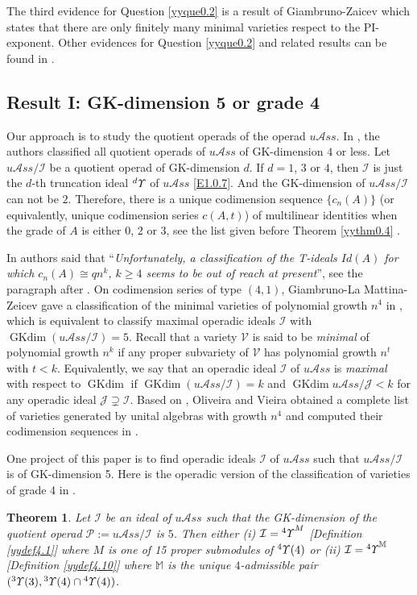 \documentclass{amsart}
\newtheorem{thm}{Theorem}[section]
\theoremstyle{definition}
\theoremstyle{remark}
\numberwithin{equation}{section}
\newcommand{\up}[1]{{^{#1}{\it \!\Upsilon}}}
\newcommand{\upa}[1]{{^{#1}{\it \!\Upsilon}}}
\def \uas{u\mathcal{A}ss}
\def \I{\mathcal{I}}
\def \ip{{\mathcal{P}}}
\def\gkdim{\operatorname{GKdim}}
\begin{document}
The third evidence for Question \ref{yyque0.2} is a result 
of Giambruno-Zaicev \cite{GZ7, GZ8} which states that there 
are only finitely many minimal varieties respect to the 
PI-exponent. Other evidences for Question \ref{yyque0.2} 
and related results can be found in \cite{Ma, Ma2}.

\subsection{Result I: GK-dimension 5 or grade 4}
\label{yysec0.5}
Our approach is to study the quotient operads of the operad
$\uas$. In \cite[Theorem 0.7]{BYZ}, the authors classified 
all quotient operads of $\uas$ of GK-dimension $4$ or less. 
Let $\uas/\I$ be a quotient operad of GK-dimension $d$. If 
$d=1$, $3$ or $4$, then $\I$ is just the $d$-th truncation 
ideal $\up{d}$ of $\uas$ \eqref{E1.0.7}. And the GK-dimension 
of $\uas/\I$ can not be $2$. Therefore, there is a unique
codimension sequence $\{c_n(A)\}$ (or equivalently, unique
codimension series $c(A,t)$) of multilinear identities 
when the grade of $A$ is either $0$, $2$ or $3$,
see the list given before Theorem \ref{yythm0.4} .

In \cite{GMP} authors said that ``{\it Unfortunately, a 
classification of the T-ideals $Id(A)$ for which $c_n(A) 
\cong q n^k$, $k \geq 4$ seems to be out of reach at present}'', 
see the paragraph after \cite[Theorem 3.6]{GMP}. 
On codimension series of type $(4, 1)$, Giambruno-La Mattina-Zeicev 
gave a classification of the minimal varieties of polynomial 
growth $n^4$ in \cite{GMZ}, which is equivalent to classify 
maximal operadic ideals $\I$ with $\gkdim(\uas/\I)=5$. Recall that 
a variety $\mathcal{V}$ is said to be {\it minimal} of polynomial 
growth $n^k$ if any proper subvariety of $\mathcal{V}$ has polynomial 
growth $n^t$ with $t<k$. Equivalently, we say that an operadic
ideal $\I$ of $\uas$ is {\it maximal} with respect to $\gkdim$ if 
$\gkdim(\uas/\I)=k$ and  $\gkdim \uas/\mathcal{J}<k$ for any 
operadic ideal $\mathcal{J}\supsetneq \I$. Based on 
\cite{GMZ}, Oliveira and Vieira obtained a complete list of 
varieties generated by unital algebras with growth 
$n^4$ and computed their codimension sequences in \cite{OV}.

One project of this paper is to find operadic ideals $\I$ 
of $\uas$ such that $\uas/\I$ is of GK-dimension 5. 
Here is the operadic version of the classification of varieties 
of grade 4 in \cite{OV}.

\begin{thm}
\label{yythm0.6}
Let $\I$ be an ideal of $\uas$ such that the GK-dimension of the quotient operad $\ip:=\uas/\I$ is $5$. 
Then either {\rm{(i)}} $\I=\up{4}^M$ {\rm{[Definition \ref{yydef4.1}]}} where $M$ is one of 15 proper submodules of $\up{4}(4)$ 
or {\rm{(ii)}} $\I=\upa{4}^{\mathbb M}$ {\rm{[Definition \ref{yydef4.10}]}} 
where ${\mathbb M}$ is the unique $4$-admissible pair $(\up{3}(3), \up{3}(4)\cap \up{4}(4))$. 
\end{thm}
\end{document}
